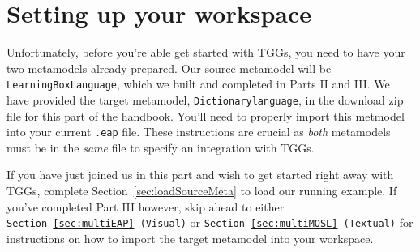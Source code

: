 \newpage
\section{Setting up your workspace}
\genHeader

Unfortunately, before you're able get started with  TGGs, you need to have your two metamodels already prepared. Our source metamodel will be
\texttt{LearningBoxLanguage}, which we built and completed in Parts II and III. We have provided the target metamodel, \texttt{Dictionarylanguage}, in the
download zip file for this part of the handbook. You'll need to properly import this metmodel into your current \texttt{.eap} file. These instructions are
crucial as \emph{both} metamodels must be in the \emph{same} file to specify an integration with TGGs.

If you have just joined us in this part and wish to get started right away with TGGs, complete Section~\ref{sec:loadSourceMeta} to load our running example. If
you've completed Part III however, skip ahead to either \texttt{Section~\ref{sec:multiEAP} (Visual)} or \texttt{Section~\ref{sec:multiMOSL} (Textual)} for
instructions on how to import the target metamodel into your workspace.

